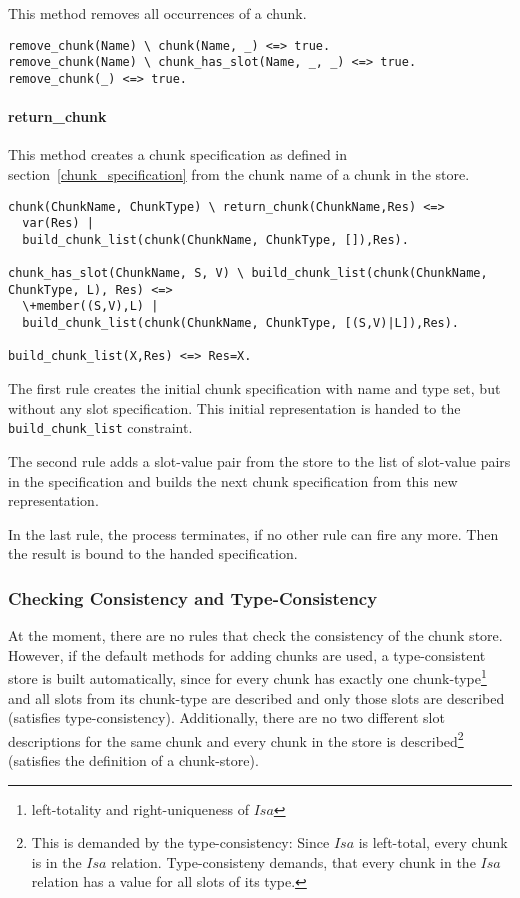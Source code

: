 This method removes all occurrences of a chunk.

\begin{lstlisting}
remove_chunk(Name) \ chunk(Name, _) <=> true.
remove_chunk(Name) \ chunk_has_slot(Name, _, _) <=> true.
remove_chunk(_) <=> true.
\end{lstlisting}

\paragraph{return\_chunk}

This method creates a chunk specification as defined in section~\ref{chunk_specification} from the chunk name of a chunk in the store.

\begin{lstlisting}[caption={rules for \texttt{return\_chunk}}]
chunk(ChunkName, ChunkType) \ return_chunk(ChunkName,Res) <=> 
  var(Res) | 
  build_chunk_list(chunk(ChunkName, ChunkType, []),Res).

chunk_has_slot(ChunkName, S, V) \ build_chunk_list(chunk(ChunkName, ChunkType, L), Res) <=> 
  \+member((S,V),L) | 
  build_chunk_list(chunk(ChunkName, ChunkType, [(S,V)|L]),Res).
  
build_chunk_list(X,Res) <=> Res=X.
\end{lstlisting}

The first rule creates the initial chunk specification with name and type set, but without any slot specification. This initial representation is handed to the \verb|build_chunk_list| constraint.

The second rule adds a slot-value pair from the store to the list of slot-value pairs in the specification and builds the next chunk specification from this new representation.

In the last rule, the process terminates, if no other rule can fire any more. Then the result is bound to the handed specification.

\subsubsection{Checking Consistency and Type-Consistency}

At the moment, there are no rules that check the consistency of the chunk store. However, if the default methods for adding chunks are used, a type-consistent store is built automatically, since for every chunk has exactly one chunk-type\footnote{left-totality and right-uniqueness of $Isa$} and all slots from its chunk-type are described and only those slots are described (satisfies type-consistency). Additionally, there are no two different slot descriptions for the same chunk and every chunk in the store is described\footnote{This is demanded by the type-consistency: Since $Isa$ is left-total, every chunk is in the $Isa$ relation. Type-consisteny demands, that every chunk in the $Isa$ relation has a value for all slots of its type.} (satisfies the definition of a chunk-store).

